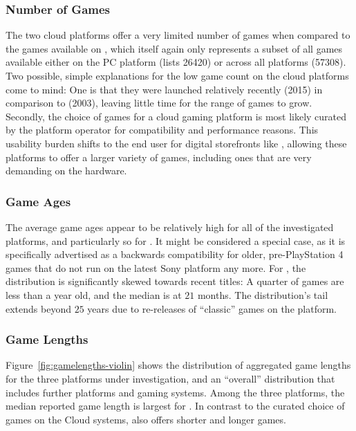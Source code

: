 \subsubsection{Number of Games}

The two cloud
platforms offer a very limited number of games when compared to the
games available on \steam, which itself again only represents a subset
of all games available either on the PC platform (\metacritic lists
\num{26420}) or across all platforms (\num{57308}). Two
possible, simple explanations for the low game count on the cloud
platforms come to mind: One is that they were launched relatively
recently (2015) in comparison to \steam (2003), leaving little time for
the range of games to grow. Secondly, the choice of games for a cloud
gaming platform is most likely curated by the platform operator for
compatibility and performance reasons. This usability burden shifts to
the end user for digital storefronts like \steam, allowing these
platforms to offer a larger variety of games, including ones that are
very demanding on the hardware.


\subsubsection{Game Ages}

The average
game ages appear to be relatively high for all of the investigated
platforms, and particularly so for \psnow. It might be considered a
special case, as it is specifically advertised as a backwards
compatibility for older, pre-PlayStation 4 games that do not run on the
latest Sony platform any more. For \steam, the distribution is
significantly skewed towards recent titles: A quarter of games are less
than a year old, and the median is at $21$ months. The
distribution's tail extends beyond $25$ years due to re-releases
of ``classic'' games on the platform.


\subsubsection{Game Lengths}
Figure~\ref{fig:gamelengths-violin} shows the distribution of aggregated
game lengths for the three platforms under investigation, and an
``overall'' distribution that includes further platforms and gaming
systems. Among the three platforms, the median reported game
length is largest for \gfnow. In
contrast to the curated choice of games on the Cloud systems, \steam
also offers shorter and longer games.

